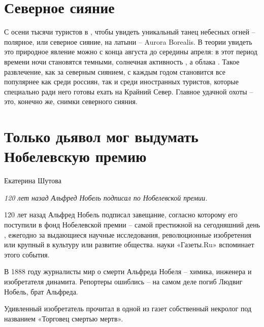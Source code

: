 \section{Северное сияние}
С  осени тысячи туристов  в , чтобы увидеть уникальный танец небесных огней -- полярное, или северное сияние, на латыни -- Aurora Borealis.
В теории увидеть это природное явление можно с конца августа до середины апреля: в этот период времени ночи становятся темными, солнечная активность , а облака .
Такое развлечение, как  за северным сиянием, с каждым годом становится все популярнее как среди россиян, так и среди иностранных туристов, которые специально ради него готовы ехать на Крайний Север. Главное  удачной охоты -- это, конечно же, снимки северного сияния.


\section{Только дьявол мог выдумать Нобелевскую премию}
Екатерина Шутова

\textit{120 лет назад Альфред Нобель подписал  по Нобелевской премии.}

120 лет назад Альфред Нобель подписал завещание, согласно которому его  поступили в фонд Нобелевской премии -- самой престижной на сегодняшний день , ежегодно  за выдающиеся научные исследования, революционные изобретения или крупный  в культуру или развитие общества.  науки «Газеты.Ru» вспоминает  этого события.

В 1888 году журналисты  мир о смерти Альфреда Нобеля -- химика, инженера и изобретателя динамита. Репортеры ошиблись -- на самом деле погиб Людвиг Нобель, брат Альфреда.

\begin{fancyquotes}
    Удивленный изобретатель прочитал в одной из газет собственный некролог под названием «Торговец смертью мертв».
\end{fancyquotes}

